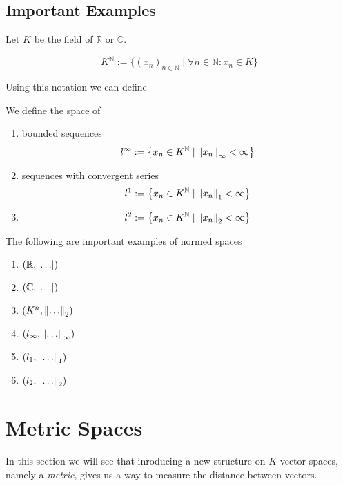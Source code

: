 \subsection{Important Examples}
Let \(K\) be the field of \(\mathbb{R}\) or \(\mathbb{C}\).
\begin{definition}
   \[K^\mathbb{N} := \{(x_n)_{n \in \mathbb{N}} \mid \forall n \in \mathbb{N}: x_n \in K\}\]
\end{definition}
Using this notation we can define
\begin{definition}
   We define the space of
   \begin{enumerate}[label=\roman*, align=Center]
      \item bounded sequences
         \[l^\infty := \left\{x_n \in K^\mathbb{N} \mid \left\lVert x_n\right\rVert_\infty < \infty\right\}\]
      \item sequences with convergent series
         \[l^1 := \left\{x_n \in K^\mathbb{N} \mid \left\lVert x_n\right\rVert_1 < \infty\right\}\]
      \item
         \[l^2 := \left\{x_n \in K^\mathbb{N} \mid \left\lVert x_n\right\rVert_2 < \infty\right\}\]
   \end{enumerate}
\end{definition}

\begin{theorem}
   The following are important examples of normed spaces
   \begin{enumerate}[label=\roman*, align=Center]
      \item \((\mathbb{R}, \left\lvert\ldots\right\rvert)\)
      \item \((\mathbb{C}, \left\lvert\ldots\right\rvert)\)
      \item \((K^n, \left\lVert\ldots\right\rVert_2)\)
      \item \((l_\infty, \left\lVert\ldots\right\rVert_\infty)\)
      \item \((l_1, \left\lVert\ldots\right\rVert_1)\)
      \item \((l_2, \left\lVert\ldots\right\rVert_2)\)
   \end{enumerate}
\end{theorem}

\section{Metric Spaces}
In this section we will see that inroducing a new structure on \(K\)-vector spaces, namely a \emph{metric}, gives us a way to measure the distance between vectors.

